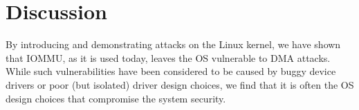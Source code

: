 

\section{Discussion}





By introducing and demonstrating \compound{} attacks on the Linux kernel, we have shown that IOMMU, as it is used today, leaves the OS vulnerable to DMA attacks. While such vulnerabilities have been considered to be caused by buggy device drivers or poor (but isolated) driver design choices, we find that it is often the OS design choices that compromise the system security.

